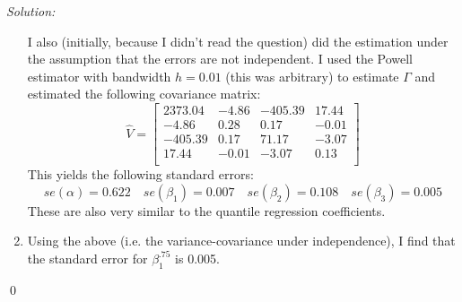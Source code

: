 \documentclass[12pt]{article}
\newenvironment{problem}[2][Problem]{\begin{trivlist}
\item[\hskip \labelsep {\bfseries #1}\hskip \labelsep {\bfseries #2.}]}{\end{trivlist}}
\newenvironment{sol}
    {\emph{Solution:}
    }
    {
    \qed
    }
\begin{document}
\begin{sol}
\begin{enumerate}[label=\alph*) ]
  I also (initially, because I didn't read the question) did the estimation under the assumption that the errors are not independent. I used the Powell estimator with bandwidth $h = 0.01$ (this was arbitrary) to estimate $\Gamma$ and estimated the following covariance matrix:
  \[\hat{V} = \begin{bmatrix}
    2373.04 & -4.86 & -405.39 & 17.44 \\ 
    -4.86 & 0.28 & 0.17 & -0.01 \\ 
    -405.39 & 0.17 & 71.17 & -3.07 \\ 
    17.44 & -0.01 & -3.07 & 0.13 \\ 
    \end{bmatrix} \]
    This yields the following standard errors:
    \[se(\alpha) = 0.622 \quad se(\beta_1) = 0.007 \quad se(\beta_2) = 0.108 \quad se(\beta_3 ) = 0.005\]
    These are also very similar to the quantile regression coefficients.
    \item Using the above (i.e. the variance-covariance under independence), I find that the standard error for $\beta_1^{.75}$ is 0.005. 
\end{enumerate}
\end{sol}
\begin{problem}{3}
\end{problem}
\end{document}
